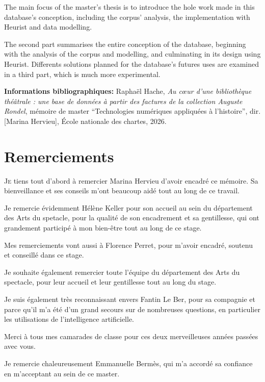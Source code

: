 \documentclass[12pt,twoside]{book}
\begin{document}
The main focus of the master’s thesis is to introduce the hole work made in this database’s conception, including the corpus’ analysis, the implementation with Heurist and data modelling.



The second part summarises the entire conception of the database, beginning with the analysis of the corpus and modelling, and culminating in its design using Heurist. Differents solutions planned for the database's futures uses are examined in a third part, which is much more experimental. 



	
	\textbf{Informations bibliographiques:} Raphaël Hache, \textit{Au cœur d'une bibliothèque théâtrale : une base de données à partir des factures de la collection Auguste Rondel}, mémoire de master \enquote{Technologies numériques appliquées à l'histoire}, dir. [Marina Hervieu], École nationale des chartes, 2026.
	
		\newpage{\pagestyle{empty}\cleardoublepage}
	
	\chapter{Remerciements}
	
\lettrine{J}e tiens tout d'abord à remercier Marina Hervieu d'avoir encadré ce mémoire. Sa bienveillance et ses conseils m'ont beaucoup aidé tout au long de ce travail.

Je remercie évidemment Hélène Keller pour son accueil au sein du département des Arts du spetacle, pour la qualité de son encadrement et sa gentillesse, qui ont grandement participé à mon bien-être tout au long de ce stage. 

Mes remerciements vont aussi à Florence Perret, pour m'avoir encadré, soutenu et conseillé dans ce stage. 

Je souhaite également remercier toute l'équipe du département des Arts du spectacle, pour leur accueil et leur gentillesse tout au long du stage. 

Je suis également très reconnaissant envers Fantin Le Ber, pour sa compagnie et parce qu'il m'a été d'un grand secours sur de nombreuses questions, en particulier les utilisations de l'intelligence artificielle. 

Merci à tous mes camarades de classe pour ces deux merveilleuses années passées avec vous. 

Je remercie chaleureusement Emmanuelle Bermès, qui m'a accordé sa confiance en m'acceptant au sein de ce master. 
\end{document}
